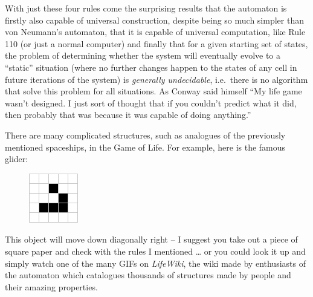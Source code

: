 \documentclass[10pt,a4paper]{article}
\begin{document}
\begin{multicols}{2}
With just these four rules come the surprising results that the
automaton is firstly also capable of universal construction, despite
being so much simpler than von Neumann's automaton, that it is capable
of universal computation, like Rule 110 (or just a normal computer) and
finally that for a given starting set of states, the problem of
determining whether the system will eventually evolve to a ``static''
situation (where no further changes happen to the states of any cell in
future iterations of the system) is \emph{generally undecidable},
i.e.~there is no algorithm that solve this problem for all situations.
As Conway said himself ``My life game wasn't designed. I just sort of
thought that if you couldn't predict what it did, then probably that was
because it was capable of doing anything.''

There are many complicated structures, such as analogues of the
previously mentioned spaceships, in the Game of Life. For example, here
is the famous glider:

\begin{figure}[htbp]
	\centering
	\includegraphics[width=\linewidth]{image_4.png}
	\caption{}
\end{figure}

This object will move down diagonally right -- I suggest you take out a
piece of square paper and check with the rules I mentioned \ldots{} or
you could look it up and simply watch one of the many GIFs on
\emph{LifeWiki}, the wiki made by enthusiasts of the automaton which
catalogues thousands of structures made by people and their amazing
properties.


\end{multicols}
\end{document}
